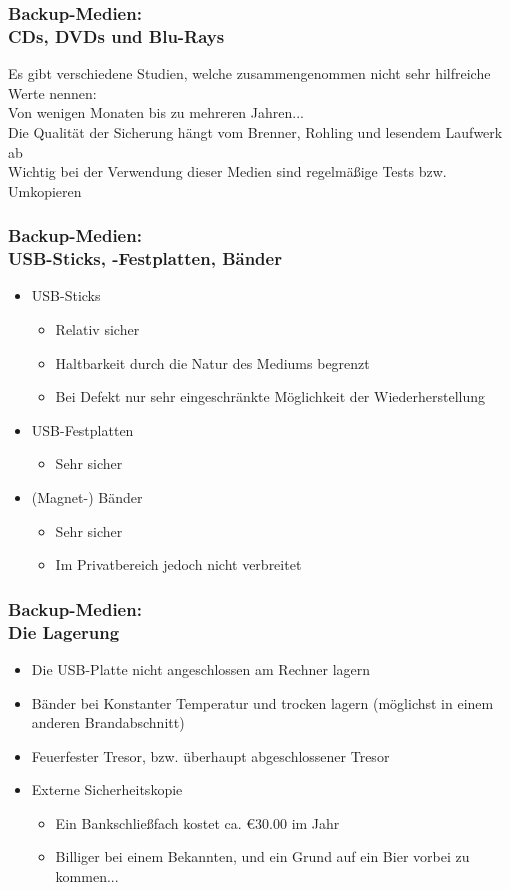\begin{frame}
  \frametitle{Backup-Medien:\\CDs, DVDs und Blu-Rays}
  \pause
  Es gibt verschiedene Studien, welche zusammengenommen nicht sehr hilfreiche Werte nennen:\\
  \pause
  Von wenigen Monaten bis zu mehreren Jahren...\\
  \pause
  Die Qualität der Sicherung hängt vom Brenner, Rohling und lesendem Laufwerk ab\\
  \pause
  Wichtig bei der Verwendung dieser Medien sind regelmäßige Tests bzw. Umkopieren
\end{frame}

\begin{frame}
  \frametitle{Backup-Medien:\\USB-Sticks, -Festplatten, Bänder}
  \pause
  \begin{itemize}
    \item USB-Sticks
      \begin{itemize}
        \item Relativ sicher
        \item Haltbarkeit durch die Natur des Mediums begrenzt
        \item Bei Defekt nur sehr eingeschränkte Möglichkeit der Wiederherstellung
      \end{itemize}
    \item USB-Festplatten
      \begin{itemize}
        \item Sehr sicher
      \end{itemize}
    \item (Magnet-) Bänder
      \begin{itemize}
        \item Sehr sicher
        \item Im Privatbereich jedoch nicht verbreitet
      \end{itemize}
  \end{itemize}

\end{frame}

\begin{frame}
  \frametitle{Backup-Medien:\\Die Lagerung}
  \pause
  \begin{itemize}
    \item Die USB-Platte nicht angeschlossen am Rechner lagern
    \item Bänder bei Konstanter Temperatur und trocken lagern (möglichst in einem anderen Brandabschnitt)
    \item Feuerfester Tresor, bzw. überhaupt abgeschlossener Tresor
    \item Externe Sicherheitskopie
      \begin{itemize}
        \item Ein Bankschließfach kostet ca. \euro{30.00} im Jahr
        \item Billiger bei einem Bekannten, und ein Grund auf ein Bier vorbei zu kommen...
      \end{itemize}
  \end{itemize}
\end{frame}

